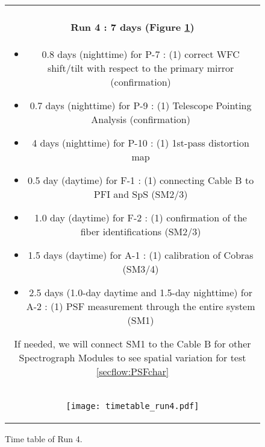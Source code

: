 \begin{figure}[!ht]
\begin{center}
\begin{tabular}{c}
\begin{minipage}{0.95\hsize}
\paragraph{Run 4 : 7 days  (Figure \ref{fig:run4})}
	\begin{itemize}
	\item 0.8 days (nighttime) for P-7 :
	(1) correct WFC shift/tilt with respect to the primary mirror (confirmation)
	\item 0.7 days (nighttime) for P-9 :
	(1) Telescope Pointing Analysis (confirmation)
	\item 4 days (nighttime) for P-10 : 
	(1) 1st-pass distortion map
	\item 0.5 day (daytime) for F-1 :  
	(1) connecting Cable B to PFI and SpS (SM2/3)
	\item 1.0 day (daytime) for F-2 :  
	(1) confirmation of  the fiber identifications (SM2/3)
	\item 1.5 days (daytime) for A-1 : 
	(1) calibration of Cobras (SM3/4)
	\item 2.5 days (1.0-day daytime and 1.5-day nighttime) for A-2 : 
	(1) PSF measurement through the entire system (SM1)
	\end{itemize}
If needed, we will connect SM1 to the Cable B for other Spectrograph Modules to see spatial variation for test \ref{secflow:PSFchar}
\end{minipage} \\
\begin{minipage}{0.8\hsize}
	\begin{center}
	\vspace*{5mm}
	\texttt{[image: timetable\_run4.pdf]}
	\end{center}
	\vspace*{-5mm}
	\caption{Time table of Run 4.}
	\label{fig:run4}
\end{minipage}
\end{tabular}
\end{center}
\end{figure}

